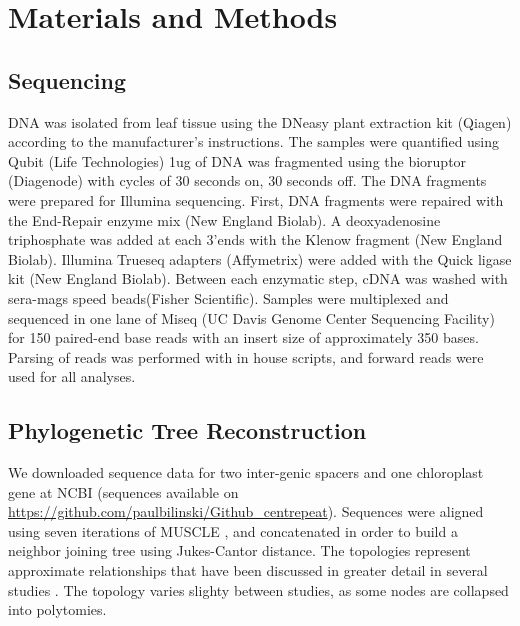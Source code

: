 \documentclass[10pt,letterpaper]{article}
\newcommand{\jri}[1]{\todo[size=\scriptsize, color=SkyBlue]{#1}}
\newcommand{\pb}[1]{\todo[size=\scriptsize, color=Bittersweet]{#1}} %
\begin{document}
\section*{Materials and Methods}

\subsection*{Sequencing}
DNA was isolated from leaf tissue using the DNeasy plant extraction kit (Qiagen) according to the manufacturer’s instructions. 
The samples were quantified using Qubit (Life Technologies) 1ug of DNA was fragmented using the bioruptor (Diagenode) with cycles of 30 seconds on, 30 seconds off. 
The DNA fragments were prepared for Illumina sequencing. 
First, DNA fragments were repaired with the End-Repair enzyme mix (New England Biolab). 
A deoxyadenosine triphosphate was added at each 3'ends with the Klenow fragment (New England Biolab). 
Illumina Trueseq adapters (Affymetrix) were added with the Quick ligase kit (New England Biolab). 
Between each enzymatic step, cDNA was washed with sera-mags speed beads(Fisher Scientific).
Samples were multiplexed and sequenced in one lane of Miseq (UC Davis Genome Center Sequencing Facility) for 150 paired-end base reads with an insert size of approximately 350 bases.
Parsing of reads was performed with in house scripts, and forward reads were used for all analyses.

\subsection*{Phylogenetic Tree Reconstruction}
We downloaded sequence data for two inter-genic spacers and one chloroplast gene at NCBI (sequences available on \url{https://github.com/paulbilinski/Github_centrepeat}).
Sequences were aligned using seven iterations of MUSCLE \cite{edgar2004muscle}, and concatenated in order to build a neighbor joining tree using Jukes-Cantor distance.
The topologies represent approximate relationships that have been discussed in greater detail in several studies  \cite{wu2012phylogeny,skendzic2007phylogenetics}.
The topology varies slighty between studies, as some nodes are collapsed into polytomies.%
\end{document}
